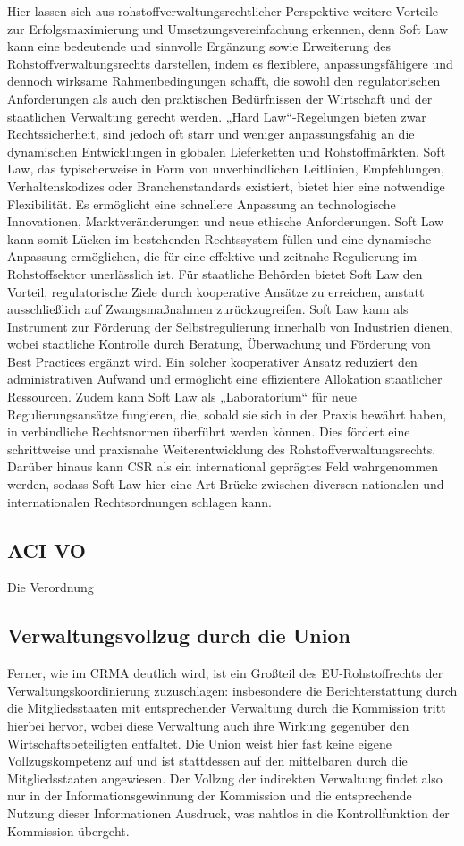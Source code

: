 \documentclass[12pt,a4paper,oneside]{book} %
\begin{document}
Hier lassen sich aus rohstoffverwaltungsrechtlicher Perspektive weitere Vorteile zur Erfolgsmaximierung und Umsetzungsvereinfachung erkennen, denn Soft Law kann eine bedeutende und sinnvolle Ergänzung sowie Erweiterung des Rohstoffverwaltungsrechts darstellen, indem es flexiblere, anpassungsfähigere und dennoch wirksame Rahmenbedingungen schafft, die sowohl den regulatorischen Anforderungen als auch den praktischen Bedürfnissen der Wirtschaft und der staatlichen Verwaltung gerecht werden. „Hard Law“-Regelungen bieten zwar Rechtssicherheit, sind jedoch oft starr und weniger anpassungsfähig an die dynamischen Entwicklungen in globalen Lieferketten und Rohstoffmärkten. Soft Law, das typischerweise in Form von unverbindlichen Leitlinien, Empfehlungen, Verhaltenskodizes oder Branchenstandards existiert, bietet hier eine notwendige Flexibilität. Es ermöglicht eine schnellere Anpassung an technologische Innovationen, Marktveränderungen und neue ethische Anforderungen. Soft Law kann somit Lücken im bestehenden Rechtssystem füllen und eine dynamische Anpassung ermöglichen, die für eine effektive und zeitnahe Regulierung im Rohstoffsektor unerlässlich ist. Für staatliche Behörden bietet Soft Law den Vorteil, regulatorische Ziele durch kooperative Ansätze zu erreichen, anstatt ausschließlich auf Zwangsmaßnahmen zurückzugreifen. Soft Law kann als Instrument zur Förderung der Selbstregulierung innerhalb von Industrien dienen, wobei staatliche Kontrolle durch Beratung, Überwachung und Förderung von Best Practices ergänzt wird. Ein solcher kooperativer Ansatz reduziert den administrativen Aufwand und ermöglicht eine effizientere Allokation staatlicher Ressourcen. Zudem kann Soft Law als „Laboratorium“ für neue Regulierungsansätze fungieren, die, sobald sie sich in der Praxis bewährt haben, in verbindliche Rechtsnormen überführt werden können. Dies fördert eine schrittweise und praxisnahe Weiterentwicklung des Rohstoffverwaltungsrechts. Darüber hinaus kann CSR als ein international geprägtes Feld wahrgenommen werden, sodass Soft Law hier eine Art Brücke zwischen diversen nationalen und internationalen Rechtsordnungen schlagen kann.


\subsection{ACI VO}
Die Verordnung 


\subsection{Verwaltungsvollzug durch die Union}
Ferner, wie im CRMA deutlich wird, ist ein Großteil des EU-Rohstoffrechts der Verwaltungskoordinierung zuzuschlagen: insbesondere die Berichterstattung durch die Mitgliedsstaaten mit entsprechender Verwaltung durch die Kommission tritt hierbei hervor, wobei diese Verwaltung auch ihre Wirkung gegenüber den Wirtschaftsbeteiligten entfaltet. Die Union weist hier fast keine eigene Vollzugskompetenz auf und ist stattdessen auf den mittelbaren durch die Mitgliedsstaaten angewiesen. Der Vollzug der indirekten Verwaltung findet also nur in der Informationsgewinnung der Kommission und die entsprechende Nutzung dieser Informationen Ausdruck, was nahtlos in die Kontrollfunktion der Kommission übergeht.
\end{document}
